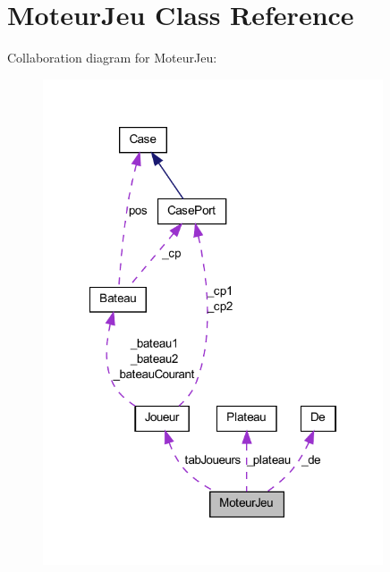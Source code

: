 \hypertarget{class_moteur_jeu}{
\section{MoteurJeu Class Reference}
\label{class_moteur_jeu}
}


Collaboration diagram for MoteurJeu:
\nopagebreak
\begin{figure}[H]
\begin{center}
\leavevmode
\includegraphics[width=285pt]{class_moteur_jeu__coll__graph}
\end{center}
\end{figure}
